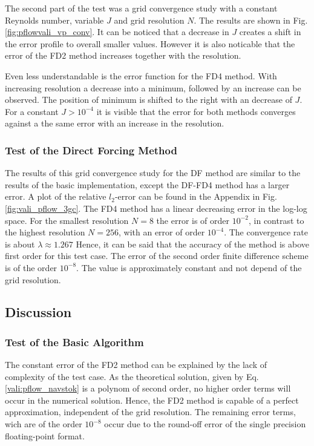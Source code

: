 The second part of the test was a grid convergence study with a constant Reynolds number, variable $J$ and grid resolution $N$.
The results are shown in Fig. \ref{fig:pflowvali_vp_conv}.
It can be noticed that a decrease in $J$ creates a shift in the error profile to overall smaller values.
However it is also noticable that the error of the FD2 method increases together with the resolution.

Even less understandable is the error function for the FD4 method.
With increasing resolution  a decrease into a minimum, followed by an increase can be observed.
The position of minimum is shifted to the right with an decrease of $J$.
For a constant $J>10^{-4}$ it is visible that the error for both methods converges against a
the same error  with an increase in the resolution.

\clearpage

\subsubsection{Test of the Direct Forcing Method}

The results of this grid convergence study for the DF method
are similar to the results of the basic implementation, except the DF-FD4 method has a larger error.
A plot of the relative $l_2$-error can be found in the Appendix in Fig.\ref{fig:vali_pflow_3gc}.
The FD4 method has a linear decreasing error in the log-log space.
For the smallest resolution $N=8$ the error is of order $10^{-2}$,
in contrast to the highest resolution $N=256$, with an error of order $10^{-4}$.
The convergence rate is about $\lambda\approx1.267$
Hence, it can be said that the accuracy of the method is above first order for this test case.
The error of the second order finite difference scheme is of the order $10^{-8}$.
The value is approximately constant and not depend of the grid resolution.

\subsection{Discussion}
\subsubsection{Test of the Basic Algorithm}

The constant error of the FD2 method can be explained by the lack of complexity of the test case.
As the theoretical solution, given by Eq. \ref{vali:pflow_navstok} is a polynom of second order,
no higher order terms will occur in the numerical solution.
Hence, the FD2 method is capable of a perfect approximation, independent of the
grid resolution. The remaining error terms, wich are of the order $10^{-8}$
occur due to the round-off error of the single precision floating-point format.

